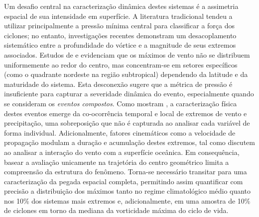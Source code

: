 Um desafio central na caracterização dinâmica destes sistemas é a assimetria espacial de sua intensidade em superfície. A literatura tradicional tendeu a utilizar principalmente a pressão mínima central para classificar a força dos ciclones; no entanto, investigações recentes demonstram um desacoplamento sistemático entre a profundidade do vórtice e a magnitude de seus extremos associados. Estudos de \citet{bitencourt2010relating} e \citet{cardoso2022synoptic} evidenciam que os máximos de vento não se distribuem uniformemente ao redor do centro, mas concentram-se em setores específicos (como o quadrante nordeste na região subtropical) dependendo da latitude e da maturidade do sistema.
Esta desconexão sugere que a métrica de pressão é insuficiente para capturar a severidade dinâmica do evento, especialmente quando se consideram os \textit{eventos compostos}. Como mostram \citet{chen2025characteristics}, a caracterização física destes eventos emerge da co-ocorrência temporal e local de extremos de vento e precipitação, uma sobreposição que não é capturada ao analisar cada variável de forma individual.
Adicionalmente, fatores cinemáticos como a velocidade de propagação modulam a duração e acumulação destes extremos, tal como discutem \citet{gramcianinov2023impact} ao analisar a interação do vento com a superfície oceânica.
Em consequência, basear a avaliação unicamente na trajetória do centro geométrico limita a compreensão da estrutura do fenômeno. Torna-se necessário transitar para uma caracterização da pegada espacial completa, permitindo assim quantificar com precisão a distribuição dos máximos tanto no regime climatológico médio quanto nos 10\% dos sistemas mais extremos e, adicionalmente, em uma amostra de 10\% de ciclones em torno da mediana da vorticidade máxima do ciclo de vida.

